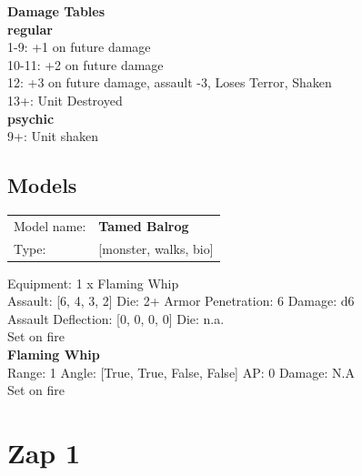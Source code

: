 {\bf Damage Tables} \\
 {\bf regular } \\
1-9: +1 on future damage \\
10-11: +2 on future damage \\
12: +3 on future damage, assault -3, Loses Terror, Shaken \\
13+: Unit Destroyed \\
 {\bf psychic } \\
9+: Unit shaken \\


\clearpage

\subsection{ Models }

\begin{tabular}{ll}
Model name: & {\bf Tamed Balrog } \\
Type: & [monster, walks, bio] \\
\end{tabular}

Equipment: 1 x Flaming Whip \\

Assault: [6, 4, 3, 2] Die: 2+ Armor Penetration: 6 Damage: d6 \\
Assault Deflection: [0, 0, 0, 0] Die: n.a.\\
\indent Set on fire\\ 
 



{\bf Flaming Whip } \\



Range: 1  Angle: [True, True, False, False] AP: 0 Damage: N.A \\
Set on fire\\ 




 















\clearpage

\section{ Zap 1 }

